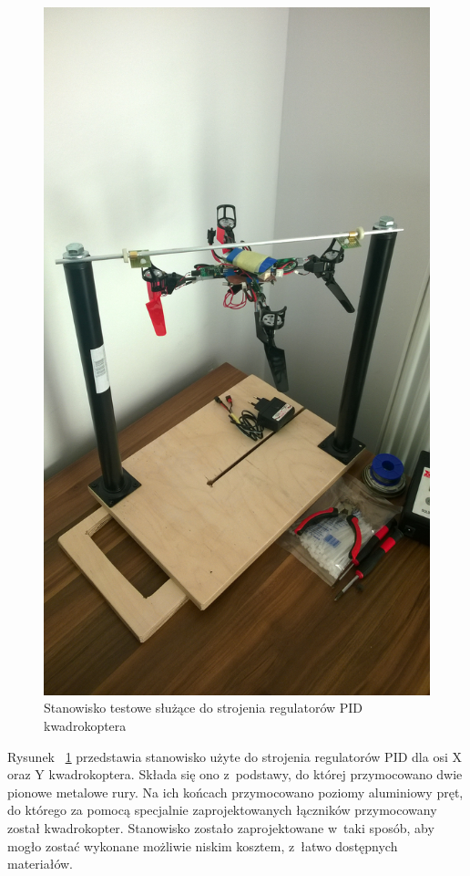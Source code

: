\documentclass[11pt, twoside]{Thesis} %
\begin{document}
\begin{figure}[H]
	\centering
	\includegraphics[scale=0.15]{Pictures/QuadroTestStation.jpg}
	\caption[Stanowisko testowe służące do strojenia regulatorów PID kwadrokoptera]{Stanowisko testowe służące do strojenia regulatorów PID kwadrokoptera}
	\label{fig:QuadroTestStation}
\end{figure}

Rysunek ~\ref{fig:QuadroTestStation} przedstawia stanowisko użyte do strojenia regulatorów PID dla osi X oraz Y kwadrokoptera. Składa się ono z~podstawy, do której przymocowano dwie pionowe metalowe rury. Na ich końcach przymocowano poziomy aluminiowy pręt, do którego za pomocą specjalnie zaprojektowanych łączników przymocowany został kwadrokopter. Stanowisko zostało zaprojektowane w~taki sposób, aby mogło zostać wykonane możliwie niskim kosztem, z~łatwo dostępnych materiałów.  
\end{document}
